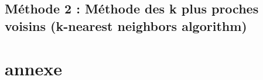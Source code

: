 \documentclass[11pt]{article}
\begin{document}
\subsection{Méthode 2 : Méthode des k plus proches voisins (k-nearest neighbors algorithm)}


\section{annexe}
\end{document}
